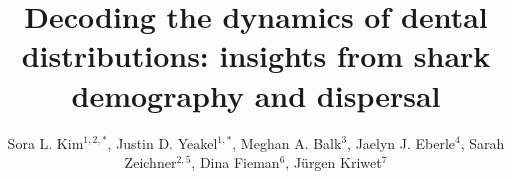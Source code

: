 \documentclass[]{rsos}%
\begin{document}
\title{Decoding the dynamics of dental distributions: insights from shark demography and dispersal}


\author{%
Sora L. Kim$^{1,2,*}$, Justin D. Yeakel$^{1,*}$, Meghan A. Balk$^{3}$, Jaelyn J. Eberle$^{4}$, Sarah Zeichner$^{2,5}$, Dina Fieman$^{6}$, J\"urgen Kriwet$^{7}$}

\address{\footnotesize{$^{1}$School of Natural Science, University of California Merced,$^{2}$Department of Geophysical Sciences, University of Chicago, $^{3}$National Ecological Observatory Network, $^{4}$Department of Geological Sciences and Museum of Natural History, University of Colorado,
$^{5}$Division of Geological and Planetary Sciences, California Institute of Technology, $^{6}$School of Geography, Environment, and Earth Sciences, Victoria University of Wellington, $^{7}$Department of Paleontology, University of Vienna
$^{*}$Contributed equally}}


\subject{paleontology, ecology, body size, migration, nursery}


\end{document}
